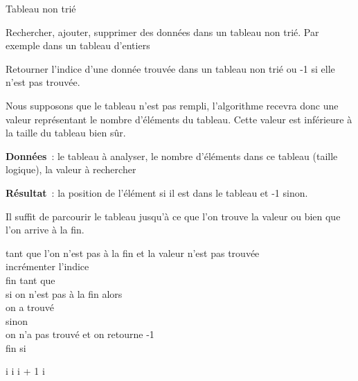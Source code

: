 \begin{Fiche}{Tableau non trié}
\label{fiche:tab-recherche-non-triee}

	
	Rechercher, ajouter, supprimer des données dans un tableau non trié. Par
	exemple dans un tableau d'entiers



	Retourner l'indice d'une donnée trouvée dans un tableau non trié ou -1 si
	elle n'est pas trouvée. 

	Nous supposons que le tableau n'est pas rempli, l'algorithme recevra donc 
	une valeur représentant le nombre d'éléments du tableau. Cette valeur est
	inférieure à la taille du tableau bien sûr. 
	
	\textbf{Données}~: le tableau à analyser, le nombre d'éléments dans ce
	tableau (taille logique), la valeur à rechercher
		
	\textbf{Résultat}~: la position de l'élément si il est dans le tableau et -1
	sinon.
	
	
		Il suffit de parcourir le tableau jusqu'à ce que l'on trouve la valeur
		ou bien que l'on arrive à la fin. 

		\begin{langagenaturel}
			tant que l'on n'est pas à la fin et la valeur n'est pas trouvée\\
			\tab incrémenter l'indice\\
			fin tant que\\
			si on n'est pas à la fin alors\\
			\tab on a trouvé\\
			sinon\\
			\tab on n'a pas trouvé et on retourne -1\\
			fin si\\
		\end{langagenaturel}

		\begin{pseudocode}
				\Let i 
					\Let i \Gets i + 1
				\EndWhile
					\Return i
				\Else
				\EndIf
			\EndAlgo
		\end{pseudocode}


\end{Fiche}
